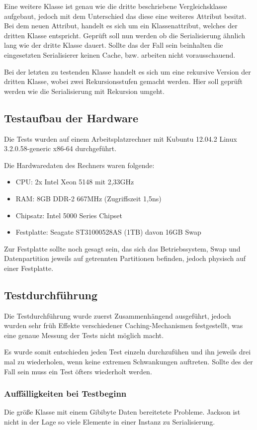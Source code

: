 Eine weitere Klasse ist genau wie die dritte beschriebene Vergleichsklasse aufgebaut, jedoch mit dem Unterschied das diese eine weiteres Attribut besitzt. Bei dem neuen Attribut, handelt es sich um ein Klassenattribut, welches der dritten Klasse entspricht.
Gepr\"uft soll nun werden ob die Serialisierung \"ahnlich lang wie der dritte Klasse dauert. Sollte das der Fall sein beinhalten die eingesetzten Serialisierer keinen Cache, bzw. arbeiten nicht vorausschauend.

Bei der letzten zu testenden Klasse handelt es sich um eine rekursive Version der dritten Klasse, wobei zwei Rekursionsstufen gemacht werden. Hier soll gepr\"uft werden wie die Serialisierung mit Rekursion umgeht.

\newpage
\subsection{Testaufbau der Hardware}
Die Tests wurden auf einem Arbeitsplatzrechner mit Kubuntu 12.04.2 Linux 3.2.0.58-generic x86-64 durchgef\"uhrt.

Die Hardwaredaten des Rechners waren folgende:
\begin{itemize}
 \item CPU: 2x Intel Xeon 5148 mit 2,33GHz
 \item RAM: 8GB DDR-2 667MHz (Zugriffszeit 1,5ns)
 \item Chipsatz: Intel 5000 Series Chipset
 \item Festplatte: Seagate ST31000528AS (1TB) davon 16GB Swap
\end{itemize}
Zur Festplatte sollte noch gesagt sein, das sich das Betriebssystem, Swap und Datenpartition jeweils auf getrennten Partitionen befinden, jedoch physisch auf einer Festplatte.

\subsection{Testdurchf\"uhrung}
Die Testdurchf\"uhrung wurde zuerst Zusammenh\"angend ausgef\"uhrt, jedoch wurden sehr fr\"uh Effekte verschiedener Caching-Mechanismen festgestellt, was eine genaue Messung der Tests nicht m\"oglich macht. 

Es wurde somit entschieden jeden Test einzeln durchzuf\"uhen und ihn jeweils drei mal zu wiederholen, wenn keine extremen Schwankungen auftreten. Sollte des der Fall sein muss ein Test \"ofters wiederholt werden.

\subsubsection{Auff\"alligkeiten bei Testbeginn}
Die gr\"o\ss{}e Klasse mit einem Gibibyte Daten bereitetete Probleme. 
Jackson ist nicht in der Lage so viele Elemente in einer Instanz zu Serialisierung.

